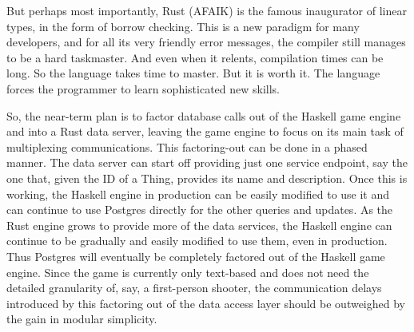 But perhaps most importantly, Rust (AFAIK) is the famous inaugurator of linear
types, in the form of borrow checking.
This is a new paradigm for many developers, and for all its very friendly error
messages, the compiler still manages to be a hard taskmaster.
And even when it relents, compilation times can be long.
So the language takes time to master.
But it is worth it.
The language forces the programmer to learn sophisticated new skills.

So, the near-term plan is to factor database calls out of the Haskell game
engine and into a Rust data server, leaving the game engine to focus on its
main task of multiplexing communications.
This factoring-out can be done in a phased manner.
The data server can start off providing just one service endpoint, say the one
that, given the ID of a Thing, provides its name and description.
Once this is working, the Haskell engine in production can be easily modified
to use it and can continue to use Postgres directly for the other queries and
updates.
As the Rust engine grows to provide more of the data services, the Haskell
engine can continue to be gradually and easily modified to use them, even in
production.
Thus Postgres will eventually be completely factored out of the Haskell game
engine.
Since the game is currently only text-based and does not need the detailed
granularity of, say, a first-person shooter, the communication delays
introduced by this factoring out of the data access layer should be outweighed
by the gain in modular simplicity.
